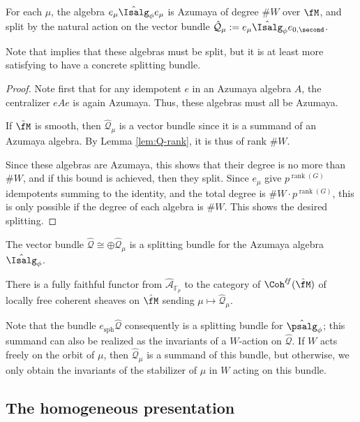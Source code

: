 \begin{lemma}
  For each $\mu$, the algebra $e_\mu\hat{\Isalg}_\phi e_\mu$ is Azumaya of degree $\#W$ over $\fM$, and split by the natural action on the vector bundle $\mathcal{\hat Q}_\mu:=e_\mu\hat{\Isalg}_\phi e_{0,\second}$.
\end{lemma}
Note that \cite[Prop. 1.24]{BKpos} implies that these algebras must be split, but it is at least more satisfying to have a concrete splitting bundle. 
\begin{proof}
 Note first that for any idempotent $e$ in an Azumaya algebra $A$, the centralizer $eAe$ is again Azumaya.  Thus, these algebras must all be Azumaya.

 If $\tilde{\fM}$ is smooth, then  $\mathcal{\hat Q}_\mu$ is a vector bundle since it is a summand of an Azumaya algebra.  By Lemma \ref{lem:Q-rank}, it is thus of rank $\#W$.
  
  Since these algebras are Azumaya, this shows that their degree is no more than $\# W$, and if this bound is achieved, then they split. Since $e_\mu$ give $p^{\operatorname{rank}(G)}$ idempotents summing to the identity, and the total degree is $\# W\cdot p^{\operatorname{rank}(G)}$, this is only possible if the degree of each algebra is $\#W$. This shows the desired splitting.
\end{proof}

\begin{corollary}\label{cor:Q-splitting}
  The vector bundle $\hat{\mathcal{Q}}\cong \oplus \hat{\mathcal{Q}}_\mu$ is a splitting bundle for the Azumaya algebra $\hat{\Isalg}_\phi$.

There is a fully faithful functor from  $\widehat{\mathscr{A}}_{\mathbb{F}_p}$ to the category of $\Coh^{\ell \!f}(\hat{\fM})$ of locally free coherent sheaves on $\hat{\fM}$ sending  $\mu\mapsto \hat{\mathcal{Q}}_\mu$.  
\end{corollary}

Note that the bundle $e_{\operatorname{sph}}\hat{\mathcal{Q}}$ consequently is a splitting bundle for $\hat{\psalg} _\phi$; this summand can also be realized 
as the invariants of a $W$-action on $\hat{\mathcal{Q}}$.   If $W$ acts freely on the orbit of $\mu$, then $\hat{\mathcal{Q}}_\mu$ is a summand of this bundle, but otherwise, we only obtain the invariants of the stabilizer of $\mu$ in $W$ acting on this bundle.

\subsection{The homogeneous presentation}


